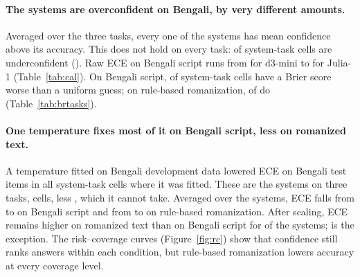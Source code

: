 \documentclass[11pt]{article}
\begin{document}
\paragraph{The systems are overconfident on Bengali, by very different amounts.}
Averaged over the three tasks, every one of the \calFull{} systems has mean confidence above its accuracy.
This does not hold on every task: \calUnderCells{} of \calCells{} system-task cells are underconfident (\calUnderNames).
Raw ECE on Bengali script runs from \eceminiNatRaw{} for d3-mini to \ecejuliaNatRaw{} for Julia-1 (Table~\ref{tab:cal}).
On Bengali script, \brierWorseBn{} of \brierCellsBn{} system-task cells have a Brier score worse than a uniform guess; on rule-based romanization, \brierWorseRule{} of \brierCellsRule{} do (Table~\ref{tab:brtasks}).

\paragraph{One temperature fixes most of it on Bengali script, less on romanized text.}
A temperature fitted on Bengali development data lowered ECE on Bengali test items in all \tsLowered{} system-task cells where it was fitted. These are the \tsSystems{} systems on three tasks, \tsPossible{} cells, less \tsMissing, which it cannot take.
Averaged over the \tsSystems{} systems, ECE falls from \eceMeanRawBn{} to \eceMeanTsBn{} on Bengali script and from \eceMeanRawRule{} to \eceMeanTsRule{} on rule-based romanization.
After scaling, ECE remains higher on romanized text than on Bengali script for \tsRomHigher{} of the \tsRomSystems{} systems; \tsRomExc{} is the exception.
The risk--coverage curves (Figure~\ref{fig:rc}) show that confidence still ranks answers within each condition, but rule-based romanization lowers accuracy at every coverage level.
\end{document}
